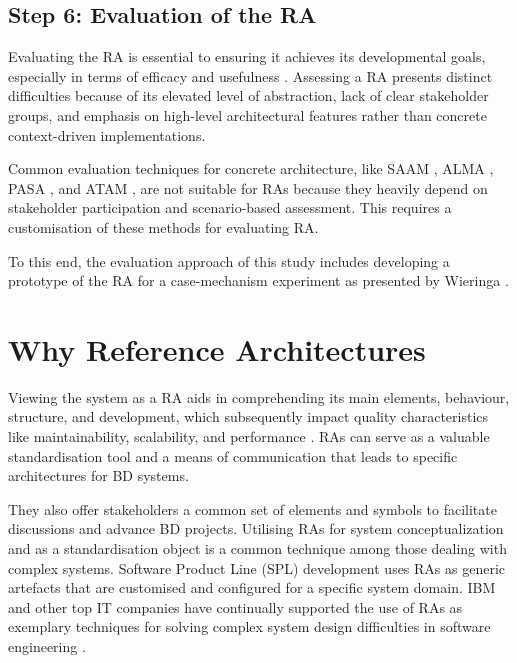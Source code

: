 \documentclass[preprint,12pt]{elsarticle}
\begin{document}
\subsection{Step 6: Evaluation of the RA}

Evaluating the RA is essential to ensuring it achieves its developmental goals, especially in terms of efficacy and usefulness \cite{Galster2011}. Assessing a RA presents distinct difficulties because of its elevated level of abstraction, lack of clear stakeholder groups, and emphasis on high-level architectural features rather than concrete context-driven implementations.

Common evaluation techniques for concrete architecture, like SAAM \cite{kazman1994saam}, ALMA \cite{Bengtsson2004}, PASA \cite{Williams2002}, and ATAM \cite{KazmanATAM}, are not suitable for RAs because they heavily depend on stakeholder participation and scenario-based assessment. This requires a customisation of these methods for evaluating RA.

To this end, the evaluation approach of this study includes developing a prototype of the RA for a case-mechanism experiment as presented by Wieringa \cite{wieringa2014design}. 

\section{Why Reference Architectures}

\label{sec:why_reference_architectures}

Viewing the system as a RA aids in comprehending its main elements, behaviour, structure, and development, which subsequently impact quality characteristics like maintainability, scalability, and performance \cite{Cloutier2010}. RAs can serve as a valuable standardisation tool and a means of communication that leads to specific architectures for BD systems. 

They also offer stakeholders a common set of elements and symbols to facilitate discussions and advance BD projects. Utilising RAs for system conceptualization and as a standardisation object is a common technique among those dealing with complex systems. Software Product Line (SPL) development uses RAs as generic artefacts that are customised and configured for a specific system domain. IBM and other top IT companies have continually supported the use of RAs as exemplary techniques for solving complex system design difficulties in software engineering \cite{ataei2022state}. 
\end{document}
